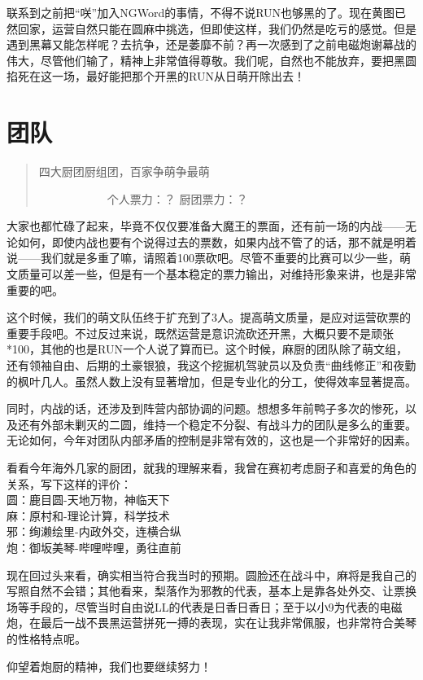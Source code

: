 联系到之前把“咲”加入NGWord的事情，不得不说RUN也够黑的了。现在黄图已然回家，运营自然只能在圆麻中挑选，但即使这样，我们仍然是吃亏的感觉。但是遇到黑幕又能怎样呢？去抗争，还是萎靡不前？再一次感到了之前电磁炮谢幕战的伟大，尽管他们输了，精神上非常值得尊敬。我们呢，自然也不能放弃，要把黑圆掐死在这一场，最好能把那个开黑的RUN从日萌开除出去！


\section{团队}
\begin{quote}
四大厨团厨组团，百家争萌争最萌

　　　　　　个人票力：？ 厨团票力：？
\end{quote}

大家也都忙碌了起来，毕竟不仅仅要准备大魔王的票面，还有前一场的内战——无论如何，即使内战也要有个说得过去的票数，如果内战不管了的话，那不就是明着说——我们就是多重了嘛，请照着100票砍吧。尽管不重要的比赛可以少一些，萌文质量可以差一些，但是有一个基本稳定的票力输出，对维持形象来讲，也是非常重要的吧。

这个时候，我们的萌文队伍终于扩充到了3人。提高萌文质量，是应对运营砍票的重要手段吧。不过反过来说，既然运营是意识流砍还开黑，大概只要不是顽张*100，其他的也是RUN一个人说了算而已。这个时候，麻厨的团队除了萌文组，还有领袖自由、后期的土豪银狼，我这个挖掘机驾驶员以及负责“曲线修正”和夜勤的枫叶几人。虽然人数上没有显著增加，但是专业化的分工，使得效率显著提高。

同时，内战的话，还涉及到阵营内部协调的问题。想想多年前鸭子多次的惨死，以及还有外部未剿灭的二圆，维持一个稳定不分裂、有战斗力的团队是多么的重要。无论如何，今年对团队内部矛盾的控制是非常有效的，这也是一个非常好的因素。

看看今年海外几家的厨团，就我的理解来看，我曾在赛初考虑厨子和喜爱的角色的关系，写下这样的评价：\\
圆：鹿目圆-天地万物，神临天下\\
麻：原村和-理论计算，科学技术\\
邪：绚濑绘里-内政外交，连横合纵\\
炮：御坂美琴-哔哩哔哩，勇往直前

现在回过头来看，确实相当符合我当时的预期。圆脸还在战斗中，麻将是我自己的写照自然不会错；其他看来，梨落作为邪教的代表，基本上是靠各处外交、让票换场等手段的，尽管当时自由说LL的代表是日香日香日；至于以小9为代表的电磁炮，在最后一战不畏黑运营拼死一搏的表现，实在让我非常佩服，也非常符合美琴的性格特点呢。

仰望着炮厨的精神，我们也要继续努力！


